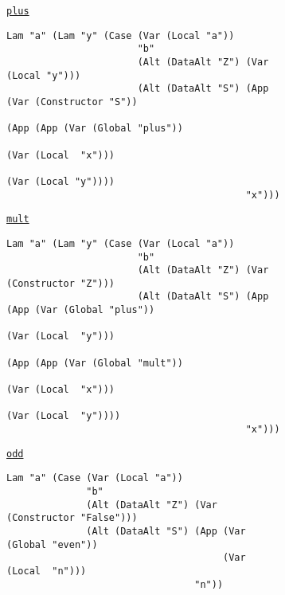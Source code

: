 \begin{figure}
  \begin{subfigure}[plus]{\textwidth}
    \begin{small}
      \underline{\texttt{plus}}
      \begin{verbatim}
Lam "a" (Lam "y" (Case (Var (Local "a"))
                       "b"
                       (Alt (DataAlt "Z") (Var (Local "y")))
                       (Alt (DataAlt "S") (App (Var (Constructor "S"))
                                               (App (App (Var (Global "plus"))
                                                         (Var (Local  "x")))
                                                    (Var (Local "y"))))
                                          "x")))
      \end{verbatim}
    \end{small}
  \end{subfigure}
  \begin{subfigure}[mult]{\textwidth}
    \begin{small}
      \underline{\texttt{mult}}
      \begin{verbatim}
Lam "a" (Lam "y" (Case (Var (Local "a"))
                       "b"
                       (Alt (DataAlt "Z") (Var (Constructor "Z")))
                       (Alt (DataAlt "S") (App (App (Var (Global "plus"))
                                                    (Var (Local  "y")))
                                               (App (App (Var (Global "mult"))
                                                         (Var (Local  "x")))
                                                    (Var (Local  "y"))))
                                          "x")))
      \end{verbatim}
    \end{small}
  \end{subfigure}
  \begin{subfigure}[odd]{\textwidth}
    \begin{small}
      \underline{\texttt{odd}}
      \begin{verbatim}
Lam "a" (Case (Var (Local "a"))
              "b"
              (Alt (DataAlt "Z") (Var (Constructor "False")))
              (Alt (DataAlt "S") (App (Var (Global "even"))
                                      (Var (Local  "n")))
                                 "n"))
      \end{verbatim}
    \end{small}
  \end{subfigure}
  \begin{subfigure}[even]{\textwidth}

\end{subfigure}
\end{figure}
